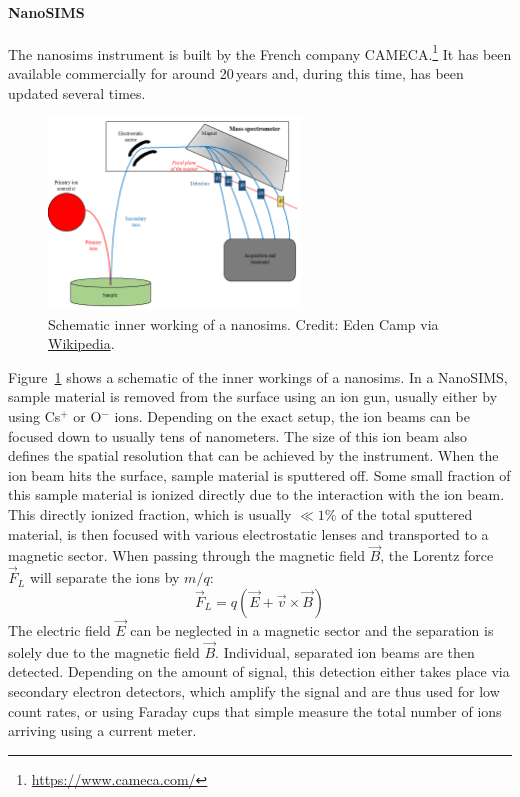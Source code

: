 \paragraph{NanoSIMS} The \acf{nanosims} instrument is built by the French company CAMECA.\footnote{\url{https://www.cameca.com/}} It has been available commercially for around 20\,years and, during this time, has been updated several times. 
\begin{figure}[tb]
    \centering
    \includegraphics[width=0.6\textwidth]{graphics/stardust/nanosims}
    \caption{Schematic inner working of a \ac{nanosims}. Credit: Eden Camp via \href{https://en.wikipedia.org/wiki/Nanoscale_secondary_ion_mass_spectrometry}{Wikipedia}.}
    \label{fig:stardust_nanosims_schematic}
\end{figure}
Figure~\ref{fig:stardust_nanosims_schematic} shows a schematic of the inner workings of a \ac{nanosims}. 
In a NanoSIMS, sample material is removed from the surface using an ion gun, usually either by using Cs$^{+}$ or O$^{-}$ ions. Depending on the exact setup, the ion beams can be focused down to usually tens of nanometers. The size of this ion beam also defines the spatial resolution that can be achieved by the instrument. When the ion beam hits the surface, sample material is sputtered off. Some small fraction of this sample material is ionized directly due to the interaction with the ion beam. This directly ionized fraction, which is usually $\ll1\%$ of the total sputtered material, is then focused with various electrostatic lenses and transported to a magnetic sector. When passing through the magnetic field $\vec{B}$, the Lorentz force $\vec{F}_L$ will separate the ions by $m/q$:
\begin{equation}
    \vec{F}_L = q(\vec{E} + \vec{v} \times \vec{B})
\end{equation}
The electric field $\vec{E}$ can be neglected in a magnetic sector and the separation is solely due to the magnetic field $\vec{B}$. Individual, separated ion beams are then detected. Depending on the amount of signal, this detection either takes place via secondary electron detectors, which amplify the signal and are thus used for low count rates, or using Faraday cups that simple measure the total number of ions arriving using a current meter.

